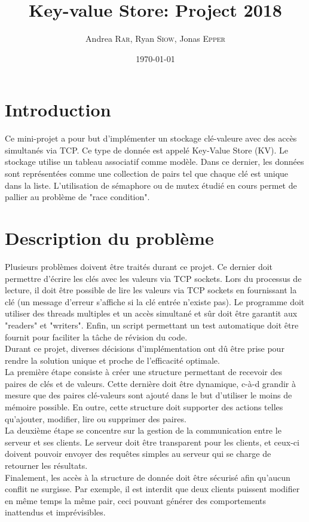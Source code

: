 \documentclass[11pt,a4paper]{article}
\title{\vspace{-10em}Key-value Store: Project 2018}
\date{\today}
\author{Andrea \textsc{Rar}, Ryan \textsc{Siow}, Jonas \textsc{Epper}}
\newcommand{\emailurl}[1]{\href{mailto:#1}{#1}}
\renewcommand\maketitle{
\begin{center}%
    {\LARGE \thetitle \vspace \baselineskip \par}%
    {\large \theauthor \vspace \baselineskip \par}%
\myaddress
\emailurl{\myemail}
\end{center}
}
\begin{document}
\maketitle
\thispagestyle{empty}

\renewcommand{\contentsname}{\large Table des matières}
\renewcommand{\baselinestretch}{0.75}\normalsize
\tableofcontents %
\newpage
\section{Introduction}
Ce mini-projet a pour but d'implémenter un stockage clé-valeure avec des accès simultanés via TCP. Ce type de donnée est appelé Key-Value Store (KV). Le stockage utilise un tableau associatif comme modèle. Dans ce dernier, les données sont représentées comme une collection de pairs tel que chaque clé est unique dans la liste. L'utilisation de sémaphore ou de mutex étudié en cours permet de pallier au problème de "race condition". 

\section{Description du problème}
Plusieurs problèmes doivent être traités durant ce projet. Ce dernier doit permettre d'écrire les clés avec les valeurs via TCP sockets. Lors du processus de lecture, il doit être possible de lire les valeurs via TCP sockets en fournissant la clé (un message d'erreur s'affiche si la clé entrée n'existe pas). Le programme doit utiliser des threads multiples et un accès simultané et sûr doit être garantit aux "readers" et "writers". Enfin, un script permettant un test automatique doit être fournit pour faciliter la tâche de révision du code.\\
Durant ce projet, diverses décisions d'implémentation ont dû être prise pour rendre la solution unique et proche de l'efficacité optimale.\\
La première étape consiste à créer une structure permettant de recevoir des paires de clés et de valeurs. Cette dernière doit être dynamique, c-à-d grandir à mesure que des paires clé-valeurs sont ajouté dans le but d'utiliser le moins de mémoire possible. En outre, cette structure doit supporter des actions telles qu'ajouter, modifier, lire ou supprimer des paires.\\
La deuxième étape se concentre sur la gestion de la communication entre le serveur et ses clients. Le serveur doit être transparent pour les clients, et ceux-ci doivent pouvoir envoyer des requêtes simples au serveur qui se charge de retourner les résultats.\\
Finalement, les accès à la structure de donnée doit être sécurisé afin qu'aucun conflit ne surgisse. Par exemple, il est interdit que deux clients puissent modifier en même temps la même pair, ceci pouvant générer des comportements inattendus et imprévisibles.\\
\end{document}
